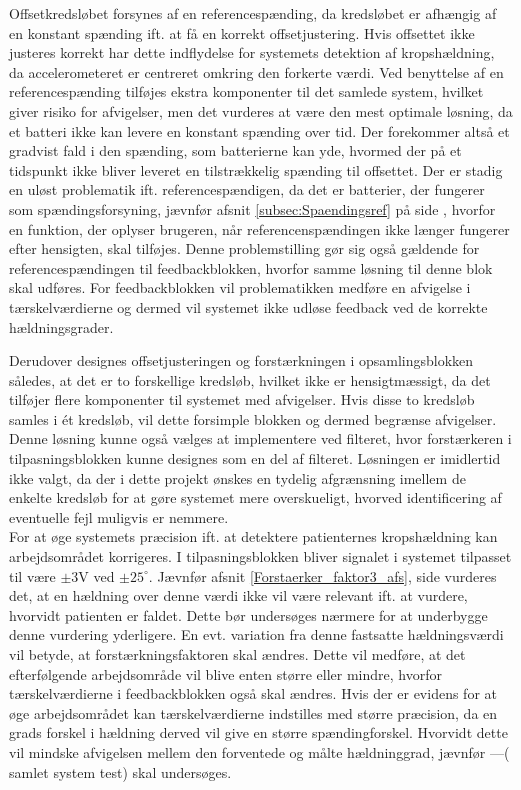 Offsetkredsløbet forsynes af en referencespænding, da kredsløbet er afhængig af en konstant spænding ift. at få en korrekt offsetjustering.  Hvis offsettet ikke justeres korrekt har dette indflydelse for systemets detektion af kropshældning, da accelerometeret er centreret omkring den forkerte værdi. Ved benyttelse af en referencespænding tilføjes ekstra komponenter til det samlede system, hvilket giver risiko for afvigelser, men det vurderes at være den mest optimale løsning, da et batteri ikke kan levere en konstant spænding over tid. Der forekommer altså et gradvist fald i den spænding, som batterierne kan yde, hvormed der på et tidspunkt ikke bliver leveret en tilstrækkelig spænding til offsettet. Der er stadig en uløst problematik ift. referencespændigen, da det er batterier, der fungerer som spændingsforsyning, jævnfør afsnit \ref{subsec:Spaendingsref} på side \pageref{subsec:Spaendingsref}, hvorfor en funktion, der oplyser brugeren, når referencenspændingen ikke længer fungerer efter hensigten, skal tilføjes. Denne problemstilling gør sig også gældende for referencespændingen til feedbackblokken, hvorfor samme løsning til denne blok skal udføres. For feedbackblokken vil problematikken medføre en afvigelse i tærskelværdierne og dermed vil systemet ikke udløse feedback ved de korrekte hældningsgrader. 

Derudover designes offsetjusteringen og forstærkningen i opsamlingsblokken således, at det er to forskellige kredsløb, hvilket ikke er hensigtmæssigt, da det tilføjer flere komponenter til systemet med afvigelser. Hvis disse to kredsløb samles i ét kredsløb, vil dette forsimple blokken og dermed begrænse afvigelser. Denne løsning kunne også vælges at implementere ved filteret, hvor forstærkeren i tilpasningsblokken kunne designes som en del af filteret. Løsningen er imidlertid ikke valgt, da der i dette projekt ønskes en tydelig afgrænsning imellem de enkelte kredsløb for at gøre systemet mere overskueligt, hvorved identificering af eventuelle fejl muligvis er nemmere.\\

For at øge systemets præcision ift. at detektere patienternes kropshældning kan arbejdsområdet korrigeres. I tilpasningsblokken bliver signalet i systemet tilpasset til være $\pm3$V ved $\pm25^{\circ}$. Jævnfør afsnit \ref{Forstaerker_faktor3_afs}, side \pageref{Forstaerker_faktor3_afs} vurderes det, at en hældning over denne værdi ikke vil være relevant ift. at vurdere, hvorvidt patienten er faldet. Dette bør undersøges nærmere for at underbygge denne vurdering yderligere. En evt. variation fra denne fastsatte hældningsværdi vil betyde, at forstærkningsfaktoren skal ændres. Dette vil medføre, at det efterfølgende arbejdsområde vil blive enten større eller mindre, hvorfor tærskelværdierne i feedbackblokken også skal ændres. Hvis der er evidens for at øge arbejdsområdet kan tærskelværdierne indstilles med større præcision, da en grads forskel i hældning derved vil give en større spændingforskel. Hvorvidt dette vil mindske afvigelsen mellem den forventede og målte hældninggrad, jævnfør ---( samlet system test) skal undersøges. 

